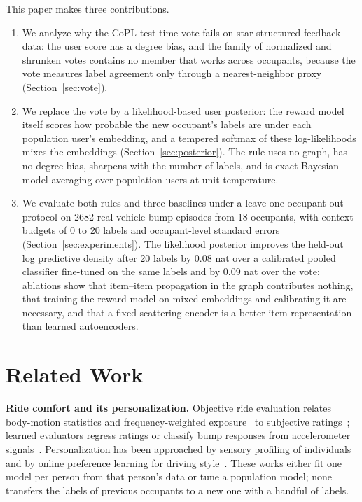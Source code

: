\documentclass[conference]{IEEEtran}
\begin{document}
This paper makes three contributions.
\begin{enumerate}
  \item We analyze why the CoPL test-time vote fails on star-structured feedback data: the user score has a degree bias, and the family of normalized and shrunken votes contains no member that works across occupants, because the vote measures label agreement only through a nearest-neighbor proxy (Section~\ref{sec:vote}).
  \item We replace the vote by a likelihood-based user posterior: the reward model itself scores how probable the new occupant's labels are under each population user's embedding, and a tempered softmax of these log-likelihoods mixes the embeddings (Section~\ref{sec:posterior}). The rule uses no graph, has no degree bias, sharpens with the number of labels, and is exact Bayesian model averaging over population users at unit temperature.
  \item We evaluate both rules and three baselines under a leave-one-occupant-out protocol on 2682 real-vehicle bump episodes from 18 occupants, with context budgets of 0 to 20 labels and occupant-level standard errors (Section~\ref{sec:experiments}). The likelihood posterior improves the held-out log predictive density after 20 labels by $0.08$ nat over a calibrated pooled classifier fine-tuned on the same labels and by $0.09$ nat over the vote; ablations show that item--item propagation in the graph contributes nothing, that training the reward model on mixed embeddings and calibrating it are necessary, and that a fixed scattering encoder is a better item representation than learned autoencoders.
\end{enumerate}

\section{Related Work}
\label{sec:related}

\textbf{Ride comfort and its personalization.} Objective ride evaluation relates body-motion statistics and frequency-weighted exposure~\cite{iso2631} to subjective ratings~\cite{guastadisegni2024ride,elbanhawi2015passenger}; learned evaluators regress ratings or classify bump responses from accelerometer signals~\cite{cieslak2020ride,kim2019evaluator}. Personalization has been approached by sensory profiling of individuals~\cite{kikuchi2025personalizing} and by online preference learning for driving style~\cite{ran2023online,bae2020robocar}. These works either fit one model per person from that person's data or tune a population model; none transfers the labels of previous occupants to a new one with a handful of labels.
\end{document}
